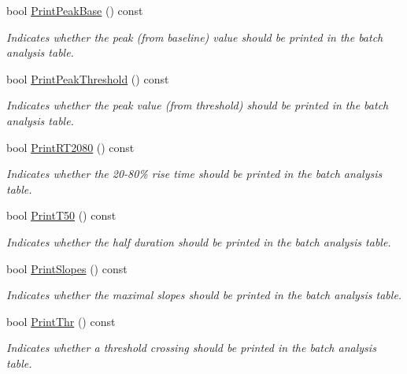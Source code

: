 \begin{DoxyCompactItemize}
bool \hyperlink{classwxStfBatchDlg_a8013a833a5c69caf27e7f0075fe76e9f}{PrintPeakBase} () const 
\begin{DoxyCompactList}\small\item\em Indicates whether the peak (from baseline) value should be printed in the batch analysis table. \item\end{DoxyCompactList}\item 
bool \hyperlink{classwxStfBatchDlg_a81f6af94be37c627dfe193fac0fb693f}{PrintPeakThreshold} () const 
\begin{DoxyCompactList}\small\item\em Indicates whether the peak value (from threshold) should be printed in the batch analysis table. \item\end{DoxyCompactList}\item 
bool \hyperlink{classwxStfBatchDlg_a74d582caee2ab99657ab8c4a090009f3}{PrintRT2080} () const 
\begin{DoxyCompactList}\small\item\em Indicates whether the 20-\/80\% rise time should be printed in the batch analysis table. \item\end{DoxyCompactList}\item 
bool \hyperlink{classwxStfBatchDlg_aec7076455bc0744df4b20a09385c0631}{PrintT50} () const 
\begin{DoxyCompactList}\small\item\em Indicates whether the half duration should be printed in the batch analysis table. \item\end{DoxyCompactList}\item 
bool \hyperlink{classwxStfBatchDlg_ae88619770e9b047126c181952cb57b90}{PrintSlopes} () const 
\begin{DoxyCompactList}\small\item\em Indicates whether the maximal slopes should be printed in the batch analysis table. \item\end{DoxyCompactList}\item 
bool \hyperlink{classwxStfBatchDlg_ab4443346bca295b1f4dca3ff1915db90}{PrintThr} () const 
\begin{DoxyCompactList}\small\item\em Indicates whether a threshold crossing should be printed in the batch analysis table. \item\end{DoxyCompactList}\item 

\end{DoxyCompactItemize}
